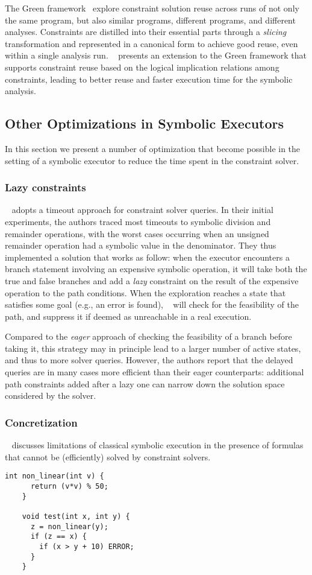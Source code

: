 The Green framework~\cite{GREEN-FSE12} explore constraint solution reuse across runs of not only the same program, but also similar programs, different programs, and different analyses. Constraints are distilled into their essential parts through a {\em slicing} transformation and represented in a canonical form to achieve good reuse, even within a single analysis run. ~\cite{JGY-ISSTA15} presents an extension to the Green framework that supports constraint reuse based on the logical implication relations among constraints, leading to better reuse and faster execution time for the symbolic analysis.

\subsection{Other Optimizations in Symbolic Executors}
In this section we present a number of optimization that become possible in the setting of a symbolic executor to reduce the time spent in the constraint solver.

\subsubsection{Lazy constraints}
~\cite{UCKLEE-USEC15} adopts a timeout approach for constraint solver queries. In their initial experiments, the authors traced most timeouts to symbolic division and remainder operations, with the worst cases occurring when an unsigned remainder operation had a symbolic value in the denominator.
They thus implemented a solution that works as follow: when the executor encounters a branch statement involving an expensive symbolic operation, it will take both the true and false branches and add a {\em lazy} constraint on the result of the expensive operation to the path conditions. When the exploration reaches a state that satisfies some goal (e.g., an error is found), ~\cite{UCKLEE-USEC15} will check for the feasibility of the path, and suppress it if deemed as unreachable in a real execution.

Compared to the {\em eager} approach of checking the feasibility of a branch before taking it, this strategy may in principle lead to a larger number of active states, and thus to more solver queries. However, the authors report that the delayed queries are in many cases more efficient than their eager counterparts: additional path constraints added after a lazy one can narrow down the solution space considered by the solver.

\subsubsection{Concretization}
~\cite{CS-CACM13} discusses limitations of classical symbolic execution in the presence of formulas that cannot be (efficiently) solved by constraint solvers.
    \begin{lstlisting}[basicstyle=\ttfamily\small]
    int non_linear(int v) {
      return (v*v) % 50;
    }
    
    void test(int x, int y) {
      z = non_linear(y);
      if (z == x) {
        if (x > y + 10) ERROR;  
      }
    }
    \end{lstlisting}

